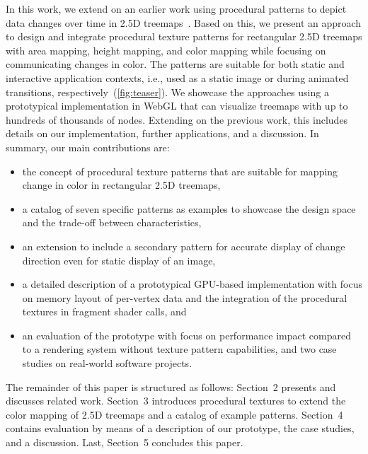 \documentclass[smallextended,natbib]{svjour3}       %
\begin{document}
In this work, we extend on an earlier work using procedural patterns to depict data changes over time in 2.5D treemaps~\citep{limberger2021-procedural-textures}.
Based on this, we present an approach to design and integrate procedural texture patterns for rectangular 2.5D treemaps with area mapping, height mapping, and color mapping while focusing on communicating changes in color.
The patterns are suitable for both static and interactive application contexts, i.e., used as a static image or during animated transitions, respectively~(\autoref{fig:teaser}).
We showcase the approaches using a prototypical implementation in WebGL that can visualize treemaps with up to hundreds of thousands of nodes.
Extending on the previous work, this includes details on our implementation, further applications, and a discussion.
In summary, our main contributions are:
\begin{itemize}
    \item the concept of procedural texture patterns that are suitable for mapping change in color in rectangular 2.5D treemaps,
    \item a catalog of seven specific patterns as examples to showcase the design space and the trade-off between characteristics,
    \item an extension to include a secondary pattern for accurate display of change direction even for static display of an image,
    \item a detailed description of a prototypical GPU-based implementation with focus on memory layout of per-vertex data and the integration of the procedural textures in fragment shader calls, and
    \item an evaluation of the prototype with focus on performance impact compared to a rendering system without texture pattern capabilities, and two case studies on real-world software projects.
\end{itemize}

The remainder of this paper is structured as follows:
Section~2 presents and discusses related work.
Section~3 introduces procedural textures to extend the color mapping of 2.5D treemaps and a catalog of example patterns.
Section~4 contains evaluation by means of a description of our prototype, the case studies, and a discussion.
Last, Section~5 concludes this paper.
\end{document}
